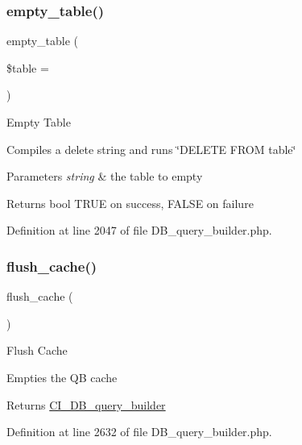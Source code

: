 \subsubsection{\texorpdfstring{empty\_table()}{empty\_table()}}
{\footnotesize\ttfamily empty\+\_\+table (\begin{DoxyParamCaption}\item[{}]{\$table = {\ttfamily \textquotesingle{}\textquotesingle{}} }\end{DoxyParamCaption})}

Empty Table

Compiles a delete string and runs \char`\"{}\+D\+E\+L\+E\+T\+E F\+R\+O\+M table\char`\"{}


\begin{DoxyParams}{Parameters}
{\em string} & the table to empty \\
\hline
\end{DoxyParams}
\begin{DoxyReturn}{Returns}
bool T\+R\+UE on success, F\+A\+L\+SE on failure 
\end{DoxyReturn}


Definition at line 2047 of file D\+B\+\_\+query\+\_\+builder.\+php.

\mbox{\label{class_c_i___d_b__query__builder_aa3c94d79d552f6e10277b01c447ebbb6}} 
\subsubsection{\texorpdfstring{flush\_cache()}{flush\_cache()}}
{\footnotesize\ttfamily flush\+\_\+cache (\begin{DoxyParamCaption}{ }\end{DoxyParamCaption})}

Flush Cache

Empties the QB cache

\begin{DoxyReturn}{Returns}
\mbox{\hyperlink{class_c_i___d_b__query__builder}{C\+I\+\_\+\+D\+B\+\_\+query\+\_\+builder}} 
\end{DoxyReturn}


Definition at line 2632 of file D\+B\+\_\+query\+\_\+builder.\+php.

\mbox{\label{class_c_i___d_b__query__builder_a91f5f004ed8e2237a4decc5d23ac3457}} 
